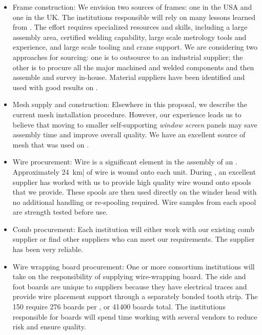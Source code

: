 \begin{itemize}

\item Frame construction: We envision two sources of frames: one in the USA and one in the UK. The institutions responsible will rely on many lessons learned from . The effort requires specialized resources and skills, including a large assembly area, certified welding capability, large scale metrology tools and experience, and large scale tooling and crane support. We are considering two approaches for sourcing: one is to outsource to an industrial supplier; the other is to procure all the major machined and welded components and then assemble and survey in-house. Material suppliers have been identified and used with good results on .

\item Mesh supply and construction: Elsewhere in this proposal, we describe the current mesh installation procedure. However, our  experience leads us to believe that moving to smaller self-supporting \textit{window screen} panels may save assembly time and improve overall  quality. We have an excellent source of mesh that was used on .

\item Wire procurement: Wire is a significant element in the assembly of an . Approximately \SI{24}{km}| of wire is wound onto each unit. During , %
an excellent supplier %
has worked with us to provide high quality wire wound onto spools that we provide. These spools are then used directly on the winder head with no additional handling or re-spooling required. Wire samples from each spool are strength tested before use.

\item Comb procurement: Each institution will either work with our existing comb supplier or find other suppliers who can meet our requirements. The  supplier has been very reliable.

\item Wire wrapping board procurement: One or more consortium institutions will take on the responsibility of supplying wire-wrapping board. The side and foot boards are unique to suppliers because they have electrical traces and provide wire placement support through a separately bonded tooth strip. The \num{150}  require \num{276} boards per , or \num{41400} boards total. The institutions responsible for boards will spend time working with several vendors to reduce risk and ensure quality. 


\end{itemize}
